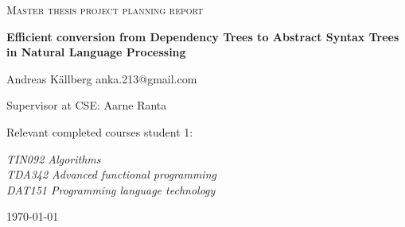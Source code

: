 \documentclass{article}
\begin{document}
\begin{titlepage}


\centering


{\scshape\LARGE Master thesis project planning report\\}

\vspace{0.5cm}

{\huge\bfseries Efficient conversion from Dependency Trees to Abstract Syntax Trees in Natural Language Processing\\}

\vspace{2cm}

{\Large Andreas Källberg anka.213@gmail.com\\}

\vspace{1.0cm}

{\large Supervisor at CSE: Aarne Ranta\\}

\vspace{1.5cm}

{\large Relevant completed courses student 1:\par}

{\itshape
    TIN092 Algorithms\\
    TDA342 Advanced functional programming\\
    DAT151 Programming language technology
\\}



\vfill



\vfill

{\large \today\\}


\end{titlepage}



\end{document}
